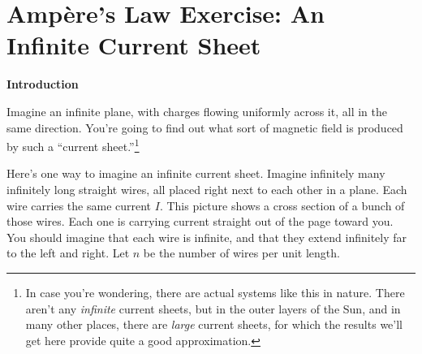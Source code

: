 \section[Ampere's Law Exercise: An Infinite Current Sheet]{Amp\`ere's Law Exercise: An Infinite Current Sheet}

\makelabheader %

\bigskip

\textbf{Introduction}

Imagine an infinite plane, with charges flowing uniformly across it,
all in the same direction. You're going to find out what sort of
magnetic field is produced by such a ``current sheet.''\footnote{In
case you're wondering, there are actual systems like this in nature.
There aren't any \textit{infinite} current sheets, but in the outer
layers of the Sun, and in many other places, there are \textit{large}
current sheets, for which the results we'll get here provide quite a good
approximation.}

Here's one way to imagine an infinite current sheet. Imagine infinitely
many infinitely long straight wires, all placed right next to each other
in a plane. Each wire carries the same current $I$. This picture shows
a cross section of a bunch of those wires. Each one is carrying current
straight out of the page toward you. You should imagine that each wire
is infinite, and that they extend infinitely far to the left and right.
Let $n$ be the number of wires per unit length.

\bigskip\bigskip

